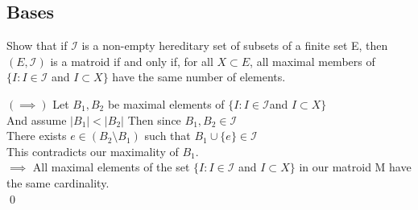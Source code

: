 \documentclass[../main.tex]{subfiles}
\begin{document}
 \subsection{Bases}
 
 \begin{thm}
 Show that if $\mathcal{I}$ is a non-empty hereditary set of subsets of a finite set E, then $(E,\mathcal{I})$ is a matroid if and only if, for all $X \subset E$, all maximal members of $\{I : I \in \mathcal{I} $ and $ I \subset X\}$ have the same number of elements.
 \end{thm}
 
\noindent \Proof $(\implies)$ Let $B_1 , B_2$ be maximal elements of $\{I : I \in \mathcal{I} $and $ I \subset X\}$ \\
\noindent And assume $|B_1| < |B_2|$
Then since $B_1, B_2 \in \mathcal{I}$
\\
There exists $e \in (B_2 \setminus B_1)$ such that $B_1 \cup \{e\} \in \mathcal{I}$
\\
This contradicts our maximality of $B_1$.\\

 \noindent $\implies$ All maximal elements of the set $\{I : I \in \mathcal{I} $ and $ I \subset X\}$ in our matroid M have the same cardinality.
 \\ \qed
 
\end{document}
